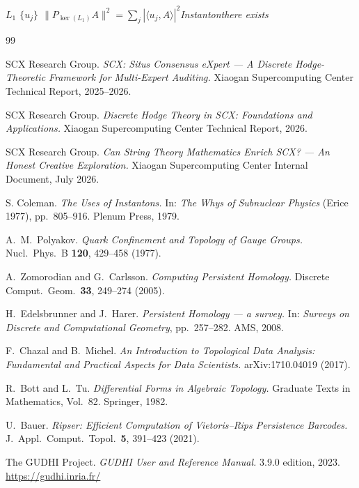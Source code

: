 \documentclass[11pt,a4paper]{article}
\theoremstyle{plain}
\theoremstyle{definition}
\begin{document}
\bigskip
\noindent
\textit{ $L_1$  $\{u_j\}$ $\|P_{\ker(L_1)} A\|^2 = \sum_j |\langle u_j, A \rangle|^2$Instantonthere exists}

\begin{thebibliography}{99}

SCX Research Group.
\textit{SCX: Situs Consensus eXpert — A Discrete Hodge-Theoretic Framework for 
Multi-Expert Auditing.}
Xiaogan Supercomputing Center Technical Report, 2025--2026.

SCX Research Group.
\textit{Discrete Hodge Theory in SCX: Foundations and Applications.}
Xiaogan Supercomputing Center Technical Report, 2026.

SCX Research Group.
\textit{Can String Theory Mathematics Enrich SCX? — An Honest Creative Exploration.}
Xiaogan Supercomputing Center Internal Document, July 2026.

S. Coleman.
\textit{The Uses of Instantons.}
In: \emph{The Whys of Subnuclear Physics} (Erice 1977), pp.\ 805--916.
Plenum Press, 1979.

A.\ M.\ Polyakov.
\textit{Quark Confinement and Topology of Gauge Groups.}
Nucl.\ Phys.\ B \textbf{120}, 429--458 (1977).

A.\ Zomorodian and G.\ Carlsson.
\textit{Computing Persistent Homology.}
Discrete Comput.\ Geom.\ \textbf{33}, 249--274 (2005).

H.\ Edelsbrunner and J.\ Harer.
\textit{Persistent Homology — a survey.}
In: \emph{Surveys on Discrete and Computational Geometry}, pp.\ 257--282.
AMS, 2008.

F.\ Chazal and B.\ Michel.
\textit{An Introduction to Topological Data Analysis: Fundamental and Practical 
Aspects for Data Scientists.}
arXiv:1710.04019 (2017).

R.\ Bott and L.\ Tu.
\textit{Differential Forms in Algebraic Topology.}
Graduate Texts in Mathematics, Vol.\ 82.
Springer, 1982.

U.\ Bauer.
\textit{Ripser: Efficient Computation of Vietoris--Rips Persistence Barcodes.}
J.\ Appl.\ Comput.\ Topol.\ \textbf{5}, 391--423 (2021).

The GUDHI Project.
\textit{GUDHI User and Reference Manual.}
3.9.0 edition, 2023.
\url{https://gudhi.inria.fr/}


\end{thebibliography}
\end{document}
